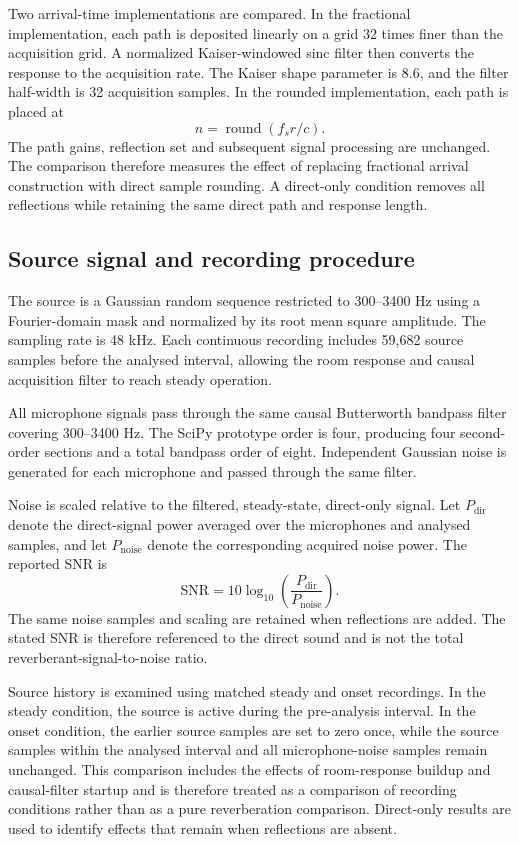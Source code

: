 \documentclass{edpsci}
\begin{document}
Two arrival-time implementations are compared. In the fractional implementation, each path is deposited linearly on a grid 32 times finer than the acquisition grid. A normalized Kaiser-windowed sinc filter then converts the response to the acquisition rate. The Kaiser shape parameter is 8.6, and the filter half-width is 32 acquisition samples. In the rounded implementation, each path is placed at
\begin{equation}
	n=\operatorname{round}(f_s r/c).
\end{equation}
The path gains, reflection set and subsequent signal processing are unchanged. The comparison therefore measures the effect of replacing fractional arrival construction with direct sample rounding. A direct-only condition removes all reflections while retaining the same direct path and response length.

\subsection{Source signal and recording procedure}

The source is a Gaussian random sequence restricted to 300--3400 Hz using a Fourier-domain mask and normalized by its root mean square amplitude. The sampling rate is 48 kHz. Each continuous recording includes 59,682 source samples before the analysed interval, allowing the room response and causal acquisition filter to reach steady operation.

All microphone signals pass through the same causal Butterworth bandpass filter covering 300--3400 Hz. The SciPy prototype order is four, producing four second-order sections and a total bandpass order of eight. Independent Gaussian noise is generated for each microphone and passed through the same filter.

Noise is scaled relative to the filtered, steady-state, direct-only signal. Let $P_{\mathrm{dir}}$ denote the direct-signal power averaged over the microphones and analysed samples, and let $P_{\mathrm{noise}}$ denote the corresponding acquired noise power. The reported SNR is
\begin{equation}
	\mathrm{SNR}
	=
	10\log_{10}
	\left(
	\frac{P_{\mathrm{dir}}}{P_{\mathrm{noise}}}
	\right).
\end{equation}
The same noise samples and scaling are retained when reflections are added. The stated SNR is therefore referenced to the direct sound and is not the total reverberant-signal-to-noise ratio.

Source history is examined using matched steady and onset recordings. In the steady condition, the source is active during the pre-analysis interval. In the onset condition, the earlier source samples are set to zero once, while the source samples within the analysed interval and all microphone-noise samples remain unchanged. This comparison includes the effects of room-response buildup and causal-filter startup and is therefore treated as a comparison of recording conditions rather than as a pure reverberation comparison. Direct-only results are used to identify effects that remain when reflections are absent.
\end{document}

